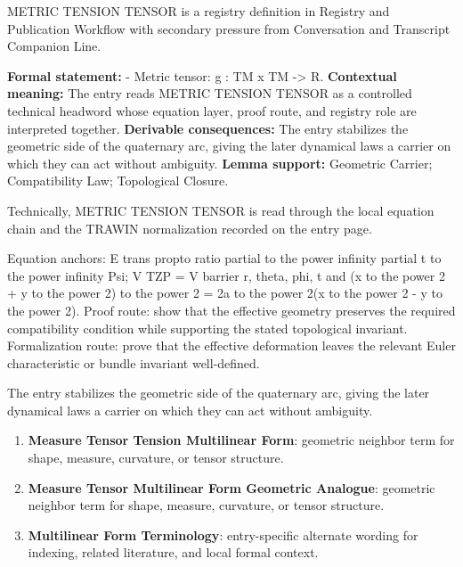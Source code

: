 
\begingroup\small
{}
METRIC TENSION TENSOR is a registry definition in Registry and Publication Workflow with secondary pressure from Conversation and Transcript Companion Line.

\begingroup\footnotesize\setlength{\emergencystretch}{3em}\sloppy
\textbf{Formal statement:} - Metric tensor: g : TM x TM -> R. \textbf{Contextual meaning:} The entry reads METRIC TENSION TENSOR as a controlled technical headword whose equation layer, proof route, and registry role are interpreted together. \textbf{Derivable consequences:} The entry stabilizes the geometric side of the quaternary arc, giving the later dynamical laws a carrier on which they can act without ambiguity. \textbf{Lemma support:} Geometric Carrier; Compatibility Law; Topological Closure.\par
\endgroup

Technically, METRIC TENSION TENSOR is read through the local equation chain and the TRAWIN normalization recorded on the entry page.

Equation anchors: E trans propto ratio partial to the power infinity partial t to the power infinity Psi; V TZP = V barrier r, theta, phi, t and (x to the power 2 + y to the power 2) to the power 2 = 2a to the power 2(x to the power 2 - y to the power 2). Proof route: show that the effective geometry preserves the required compatibility condition while supporting the stated topological invariant. Formalization route: prove that the effective deformation leaves the relevant Euler characteristic or bundle invariant well-defined.

The entry stabilizes the geometric side of the quaternary arc, giving the later dynamical laws a carrier on which they can act without ambiguity.
\endgroup

\begin{enumerate}[leftmargin=1.6em,itemsep=6pt,topsep=4pt]
\item \textbf{Measure Tensor Tension Multilinear Form}: geometric neighbor term for shape, measure, curvature, or tensor structure.
\item \textbf{Measure Tensor Multilinear Form Geometric Analogue}: geometric neighbor term for shape, measure, curvature, or tensor structure.
\item \textbf{Multilinear Form Terminology}: entry-specific alternate wording for indexing, related literature, and local formal context.
\end{enumerate}

